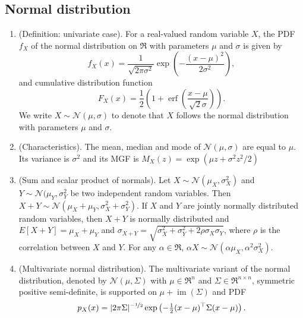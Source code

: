 \documentclass[a4paper,10pt]{scrbook}
\begin{document}
\subsection{Normal distribution}\label{sec:normal_distribution}
\begin{enumerate}
 \item (Definition: univariate case). For a real-valued random variable \(X\), the PDF \(f_X\) of the normal 
       distribution on \(\Re\) with parameters \(\mu\) and \(\sigma\) is given by
 \[
  f_X(x) = \frac{1}{\sqrt{2\pi \sigma^2}}\exp\left(-\frac{(x-\mu)^2}{2\sigma^2}\right),
 \]
 and cumulative distribution function 
 \[
  F_X(x) = \frac{1}{2}\left( 1 + \operatorname{erf}\left(\frac{x-\mu}{\sqrt{2} \sigma}\right) \right).
 \]
 We write \(X\sim \mathcal{N}(\mu, \sigma)\) to denote that \(X\) follows the normal distribution 
 with parameters \(\mu\) and \(\sigma\).

 \item (Characteristics). The mean, median and mode of \(\mathcal{N}(\mu, \sigma)\) are equal to \(\mu\).
       Its variance is \(\sigma^2\) and its MGF is \(M_X(z) = \exp(\mu z + \sigma^2 z^2/2)\)

 \item (Sum and scalar product of normals). Let \(X\sim\mathcal{N}(\mu_X, \sigma_X^2)\) and 
       \(Y\sim\mathcal{N}(\mu_Y, \sigma_Y^2\) be two independent random variables. 
       Then \(X+Y\sim\mathcal{N}(\mu_X+\mu_Y, \sigma_X^2 + \sigma_Y^2)\).
       If \(X\) and \(Y\) are jointly normally distributed random variables, then 
       \(X+Y\) is normally distributed and \(E[X+Y] = \mu_X + \mu_Y\) and 
       \(\sigma_{X+Y} = \sqrt{\sigma_X^2 + \sigma_Y^2 + 2\rho\sigma_X\sigma_Y}\), where 
       \(\rho\) is the correlation between \(X\) and \(Y\).
       For any \(\alpha\in\Re\), \(\alpha X\sim \mathcal{N}(\alpha\mu_X, \alpha^2\sigma_X^2)\).
       
 \item (Multivariate normal distribution). The multivariate variant of the normal distribution,
       denoted by $\mathcal{N}(\mu, \Sigma)$ with $\mu\in\Re^n$ and $\Sigma\in\Re^{n\times n}$,
       symmetric positive semi-definite, is supported on $\mu + \operatorname{im}(\Sigma)$
       and PDF 
       \[
        p_X(x) = |2\pi \Sigma|^{-\nicefrac{1}{2}}\exp\left(-\tfrac{1}{2}(x-\mu)^{\top}\Sigma(x-\mu)\right).
       \]


\end{enumerate}
\end{document}

